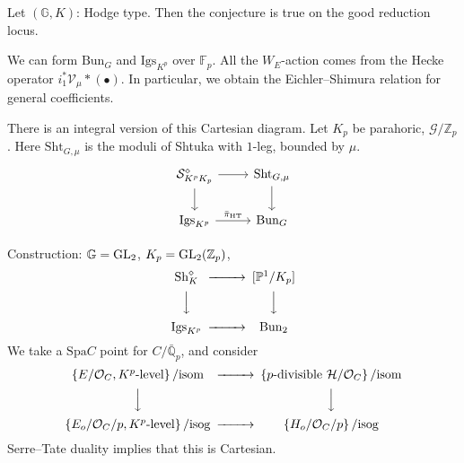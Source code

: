 \documentclass[reqno]{amsart} 
\begin{document}
\begin{theorem}[DvHKZ24]
  Let $(\mathbb{G}, K)$: Hodge type.  Then the conjecture is true on the good reduction locus.
\end{theorem}
\begin{remark}
  We can form $\mathrm{Bun}_G$ and $\mathrm{Igs}_{K^p}$ over $\mathbb{F}_p$.  All the $W_E$-action comes from the Hecke operator $i_1^\ast \mathcal{V}_\mu \ast(\bullet)$.  In particular, we obtain the Eichler--Shimura relation for general coefficients.
\end{remark}
\begin{remark}
  There is an integral version of this Cartesian diagram.  Let $K_p$ be parahoric, $\mathcal{G} / \mathbb{Z}_p$.  Here $\mathrm{Sht}_{G, \mu}$ is the moduli of Shtuka with $1$-leg, bounded by $\mu$.
  \begin{equation*}
    \begin{tikzcd}
      \mathcal{S}_{K^p K_p}^{\diamond} \arrow[r] \arrow[d] & \mathrm{Sht}_{G, \mu} \arrow[d] \\
      \mathrm{Igs}_{K^p} \arrow[r, "\bar{\pi}_{\mathrm{H T}}"] & \mathrm{Bun}_G
    \end{tikzcd}
  \end{equation*}
  
\end{remark}
\begin{remark}
  Construction: $\mathbb{G} = \operatorname{GL}_2$, $K_p = \operatorname{GL}_2(\mathbb{Z}_p)$,
  \begin{equation*}
    \begin{CD}         
      \mathrm{Sh}_K^{\diamond} @>>>[\mathbb{P}^1 / K_p]\\
      @VVV  @VVV \\
      \mathrm{Igs}_{K^p} @>>> \mathrm{Bun}_2 \\
    \end{CD}
  \end{equation*}
  We take a $\mathrm{Spa} C$ point for $C / \bar{\mathbb{Q}}_p$, and consider
  \begin{equation*}
    \begin{CD}         
      \left\{ E / \mathcal{O}_C , K^p \text{-level} \right\}/ \mathrm{isom} @>>>
      \left\{ \text{$p$-divisible } \mathcal{H} / \mathcal{O}_C  \right\}/ \mathrm{isom}
      \\
      @VVV  @VVV \\
      \left\{ E_o / \mathcal{O}_C / p, K^p\text{-level} \right\}/\mathrm{isog} @>>>
      \left\{ H_o / \mathcal{O}_C / p \right\} / \mathrm{isog}\\
    \end{CD}
  \end{equation*}
  Serre--Tate duality implies that this is Cartesian.
\end{remark}
\end{document}
